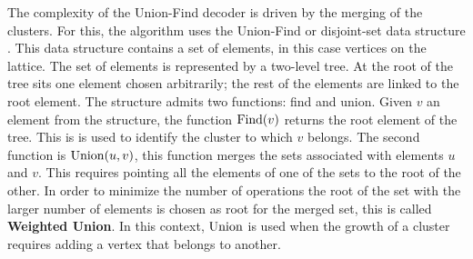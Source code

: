 The complexity of the Union-Find decoder is driven by the merging of the clusters. For this, the algorithm uses the Union-Find or disjoint-set data structure \cite{tarjan1975efficiency}. This data structure contains a set of elements, in this case vertices on the lattice. The set of elements is represented by a two-level tree. At the root of the tree sits one element chosen arbitrarily; the rest of the elements are linked to the root element. The structure admits two functions: find and union. Given $v$ an element from the structure, the function $\operatorname{Find}(v)$ returns the root element of the tree. This is is used to %
identify the cluster to which $v$ belongs. The second function is $\operatorname{Union}(u, v)$, this function merges the sets associated with elements $u$ and $v$. This requires pointing all the elements of one of the sets to the root of the other. In order to minimize the number of operations the root of the set with the larger number of elements is chosen as root for the merged set, this is called \textbf{Weighted Union}. In this context, $\operatorname{Union}$ is used when the growth of a cluster requires adding a vertex that belongs to another. %